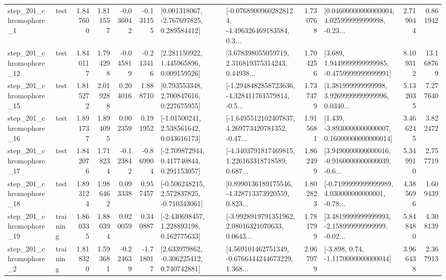 \begin{tabular}{llrrrrllrlrr}
   step\_201\_chromophore\_1 &      test &      1.847600 &    1.811557 &     -0.036042 & -0.131155 &    [0.001318067, -2.767697825, 0.289584412] &  [-0.07689009602828124, -4.496326469183584, 0.3... &       1.730768 &  [0.04600000000000004, 4.025999999999998, -0.23... &            2.719044 &          0.861942 \\
  step\_201\_chromophore\_12 &      test &      1.840117 &    1.794298 &     -0.045819 & -0.213416 &     [2.281150922, 1.445965896, 0.009159526] &  [3.678398055059719, 2.316819375314243, 0.44938... &       1.704256 &   [3.689, 1.9449999999999985, -0.4759999999999991] &            8.109312 &         13.168769 \\
  step\_201\_chromophore\_15 &      test &      1.815272 &    2.019288 &      0.204016 &  1.888710 &     [0.793553348, 2.700847616, 0.227675955] &  [-1.2948482858723636, -4.328411761579814, -0.5... &       1.737479 &  [1.381999999999998, 3.9269999999999996, 0.0340... &            5.132035 &          7.277640 \\
  step\_201\_chromophore\_16 &      test &      1.891737 &    1.894095 &      0.002359 &  0.191952 &     [-1.01500241, 2.538561642, 0.043616173] &  [-1.6495512102407837, 4.269773420781352, -0.47... &       1.915681 &  [1.439, -3.8930000000000007, 0.16000000000000014] &            3.466245 &          3.822472 \\
  step\_201\_chromophore\_17 &      test &      1.842076 &    1.718234 &     -0.123842 & -0.869904 &    [-2.709872944, 0.417740844, 0.291153057] &  [-4.3403791817469815, 1.226163318718589, 0.687... &       1.862499 &  [3.9490000000000016, -0.9160000000000039, -0.6... &            5.349910 &          2.757719 \\
  step\_201\_chromophore\_18 &      test &      1.893124 &    1.986462 &      0.093338 &  0.957457 &   [-0.506248215, 2.572837825, -0.710343061] &  [0.8990136189175546, -4.328713373920559, 0.823... &       1.802823 &  [-0.7199999999999989, 4.030000000000001, -0.78... &            4.385696 &          1.609439 \\
  step\_201\_chromophore\_19 &  training &      1.860335 &    1.880394 &      0.020059 &  0.340887 &    [-2.430698457, 1.228893198, 0.162775633] &  [-3.9928919791351962, 2.08016321070633, 0.0643... &       1.781799 &  [3.4819999999999993, -2.158999999999999, -0.02... &            5.848480 &          4.308139 \\
   step\_201\_chromophore\_2 &  training &      1.818320 &    1.593681 &     -0.224639 & -1.718017 &    [2.633979862, -0.306225412, 0.740742881] &  [4.569101462751349, -0.6766444244673229, 1.368... &       2.067979 &                [-3.898, 0.74, -1.1170000000000044] &            3.966438 &          2.367913 \\

\end{tabular}
